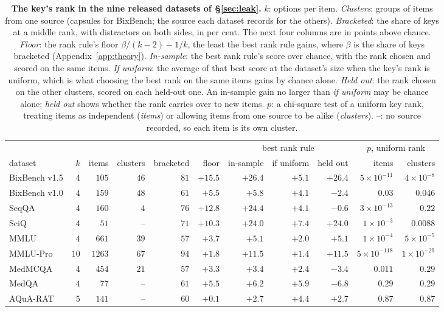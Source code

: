 \documentclass{article}
\begin{document}
\begin{table}[htbp]
\centering\footnotesize\setlength{\tabcolsep}{2.4pt}
\caption{\textbf{The key's rank in the nine released datasets of \S\ref{sec:leak}.} \emph{$k$}: options per item.
\emph{Clusters}: groups of items from one source (capsules for BixBench; the source each dataset records for the
others). \emph{Bracketed}: the share of keys at a middle rank, with distractors
on both sides, in per cent. The next four columns are in points above chance. \emph{Floor}: the rank rule's floor
$\beta/(k-2)-1/k$, the least the best rank rule gains, where $\beta$ is the share of keys bracketed
(Appendix~\ref{app:theory}). \emph{In-sample}: the best rank rule's score over chance, with the rank chosen and scored
on the same items. \emph{If uniform}: the average of that best score at the dataset's size when the key's rank is
uniform, which is what choosing the best rank on the same items gains by chance alone. \emph{Held out}: the rank chosen
on the other clusters, scored on each held-out one. An in-sample gain no larger than \emph{if uniform} may be chance
alone; \emph{held out} shows whether the rank carries over to new items. $p$: a chi-square test of a uniform key rank, treating items as
independent (\emph{items}) or allowing items from one source to be alike (\emph{clusters}). --: no source recorded, so
each item is its own cluster.}
\label{tab:survey}
\begin{tabular}{lrrrrrrrrrr}
\toprule
& & & & & & \multicolumn{3}{c}{best rank rule} & \multicolumn{2}{c}{$p$, uniform rank}\\
\cmidrule(lr){7-9}\cmidrule(lr){10-11}
dataset & $k$ & items & clusters & bracketed & floor & in-sample & if uniform & held out & items & clusters\\
\midrule
BixBench v1.5 & $4$ & $105$ & $46$ & $81$ & $+15.5$ & $+26.4$ & $+5.1$ & $+26.4$ & $5\times10^{-11}$ & $4\times10^{-8}$\\
BixBench v1.0 & $4$ & $159$ & $48$ & $61$ & $+5.5$ & $+5.8$ & $+4.1$ & $-2.4$ & $0.03$ & $0.046$\\
SeqQA & $4$ & $160$ & $4$ & $76$ & $+12.8$ & $+24.4$ & $+4.1$ & $-0.6$ & $3\times10^{-13}$ & $0.22$\\
SciQ & $4$ & $51$ & -- & $71$ & $+10.3$ & $+24.0$ & $+7.4$ & $+24.0$ & $1\times10^{-3}$ & $0.0088$\\
MMLU & $4$ & $661$ & $39$ & $57$ & $+3.7$ & $+5.1$ & $+2.0$ & $+5.1$ & $1\times10^{-4}$ & $5\times10^{-5}$\\
MMLU-Pro & $10$ & $1263$ & $67$ & $94$ & $+1.8$ & $+11.5$ & $+1.4$ & $+11.5$ & $5\times10^{-118}$ & $1\times10^{-29}$\\
MedMCQA & $4$ & $454$ & $21$ & $57$ & $+3.3$ & $+3.4$ & $+2.4$ & $-3.4$ & $0.011$ & $0.29$\\
MedQA & $4$ & $77$ & -- & $61$ & $+5.5$ & $+6.2$ & $+5.9$ & $-6.8$ & $0.29$ & $0.29$\\
AQuA-RAT & $5$ & $141$ & -- & $60$ & $+0.1$ & $+2.7$ & $+4.4$ & $+2.7$ & $0.87$ & $0.87$\\
\bottomrule
\end{tabular}
\end{table}
\end{document}
